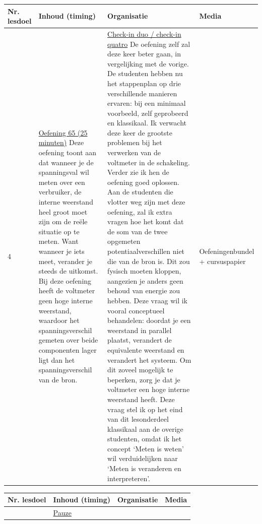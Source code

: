 \begin{landscape}
\begin{tabularx}{1.56\textwidth}{|p{1.5cm}|p{6cm}|X|p{4cm}|}
	\hline
	\textbf{Nr. lesdoel } & \textbf{Inhoud (timing)}  & \textbf{Organisatie } & \textbf{Media } \\ \hline
	4\newline 5\newline 6 &\underline{Oefening 65 (25 minuten)}\newline
	Deze oefening toont aan dat wanneer je de spanningsval wil meten over een verbruiker, de interne weerstand heel groot moet zijn om de reële situatie op te meten. Want wanneer je iets meet, verander je steeds de uitkomst. Bij deze oefening heeft de voltmeter geen hoge interne weerstand, waardoor het spanningsverschil gemeten over beide componenten lager ligt dan het spanningsverschil van de bron.
	& 	\underline{Check-in duo / check-in quatro}\newline
	De oefening zelf zal deze keer beter gaan, in vergelijking met de vorige. De studenten hebben nu het stappenplan op drie verschillende manieren ervaren: bij een minimaal voorbeeld, zelf geprobeerd en klassikaal. Ik verwacht deze keer de grootste problemen bij het verwerken van de voltmeter in de schakeling. Verder zie ik hen de oefening goed oplossen.\newline
	Aan de studenten die vlotter weg zijn met deze oefening, zal ik extra vragen hoe het komt dat de som van de twee opgemeten potentiaalverschillen niet die van de bron is. Dit zou fysisch moeten kloppen, aangezien je anders geen behoud van energie zou hebben. Deze vraag wil ik vooral conceptueel behandelen: doordat je een weerstand in parallel plaatst, verandert de equivalente weerstand en verandert het systeem. Om dit zoveel mogelijk te beperken, zorg je dat je voltmeter een hoge interne weerstand heeft. Deze vraag stel ik op het eind van dit lesonderdeel klassikaal aan de overige studenten, omdat ik het concept `Meten is weten' wil verduidelijken naar `Meten is veranderen en interpreteren'.
	& Oefeningenbundel + cursuspapier
	\\ \hline
\end{tabularx}






\begin{tabularx}{1.56\textwidth}{|p{1.5cm}|p{6cm}|X|p{4cm}|}
	\hline
	\textbf{Nr. lesdoel } & \textbf{Inhoud (timing)}  & \textbf{Organisatie } & \textbf{Media } \\ \hline
		&\underline{Pauze}\newline
	

\end{tabularx}
\end{landscape}
